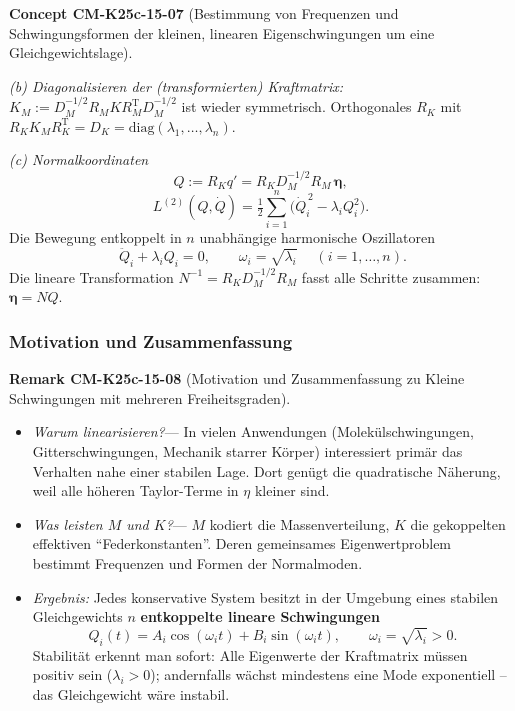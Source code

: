 \documentclass[10pt, letterpaper]{article}
\newcommand{\CustomHeading}[3]{%
  \par\medskip\noindent%
  \textbf{#1 #2} \textnormal{(#3)}.\enskip%
}
\newenvironment{REM}[2]{\begin{unitbox}\CustomHeading{Remark}{#1}{#2}}{\end{unitbox}}
\newenvironment{CONC}[2]{\begin{unitbox}\CustomHeading{Concept}{#1}{#2}}{\end{unitbox}}
\begin{document}
\begin{CONC}{CM-K25c-15-07}{Bestimmung von Frequenzen und Schwingungsformen der kleinen, linearen Eigen­schwingungen um eine Gleichgewichtslage}
\begin{enumerate}[label=\textbf{\arabic*.},wide=0pt,leftmargin=*]
\emph{(b) Diagonalisieren der (transformierten) Kraftmatrix:}\\
\(K_M:=D_M^{-1/2} R_M K R_M^{\mathrm T}D_M^{-1/2}\)
ist wieder symmetrisch.
Orthogonales $R_K$ mit
\(R_K K_M R_K^{\mathrm T}=D_K=\mathrm{diag}(\lambda_1,\dots,\lambda_n)\).

\emph{(c) Normalkoordinaten}\\
\[
  Q := R_K q'
  =R_K D_M^{-1/2}R_M\,\boldsymbol\eta ,
\]
\[
  L^{(2)}(Q,\dot Q)=
    \tfrac12\sum_{i=1}^{n}
      \bigl(\dot Q_i^{\,2}-\lambda_i Q_i^{2}\bigr).
\]
Die Bewegung entkoppelt in $n$ unabhängige
harmonische Oszillatoren
\[
  \boxed{\;\ddot Q_i + \lambda_i Q_i = 0,\qquad
          \omega_i=\sqrt{\lambda_i}\;}
  \quad (i=1,\dots,n).
\]
Die lineare Transformation
\(
  N^{-1}=R_K D_M^{-1/2}R_M
\)
fasst alle Schritte zusammen:
\(
  \boldsymbol\eta = N Q.
\)
\end{enumerate}
\end{CONC}

\subsubsection*{Motivation und Zusammenfassung}

\begin{REM}{CM-K25c-15-08}{Motivation und Zusammenfassung zu Kleine Schwingungen mit mehreren Freiheitsgraden}
\begin{itemize}[leftmargin=*]
\item \emph{Warum linearisieren?}\;—
      In vielen Anwendungen (Molekülschwingungen, Gitterschwingungen,
      Mechanik starrer Körper) interessiert primär das Verhalten nahe
      einer stabilen Lage. Dort genügt die quadratische Näherung, weil
      alle höheren Taylor-Terme in \(\eta\) kleiner sind.
\item \emph{Was leisten $M$ und $K$?}\;—
      $M$ kodiert die Massenverteilung,
      $K$ die gekoppelten effektiven “Feder­konstanten”.
      Deren gemeinsames Eigenwert­problem bestimmt Frequenzen und
      Formen der Normalmoden.
\item \emph{Ergebnis:}\;
      Jedes konservative System besitzt in der Umgebung eines stabilen
      Gleichgewichts $n$ \textbf{entkoppelte lineare Schwingungen}
      \[
        Q_i(t)=A_i\cos(\omega_i t)+B_i\sin(\omega_i t),
        \qquad
        \omega_i=\sqrt{\lambda_i}>0.
      \]
      Stabilität erkennt man sofort:
      Alle Eigenwerte der Kraftmatrix müssen positiv sein
      (\(\lambda_i>0\)); andernfalls wächst mindestens eine Mode
      exponentiell – das Gleichgewicht wäre instabil.
\end{itemize}
\end{REM}
\end{document}
